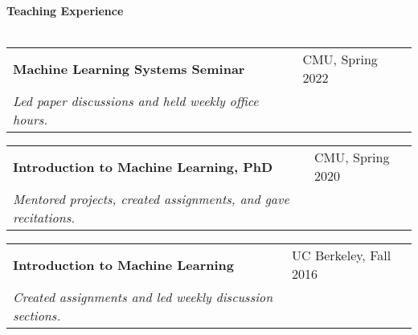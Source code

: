\documentclass{article}
\begin{document}
\vspace{3mm}
\noindent
\textbf{{\Large Teaching Experience}}\\[-2mm]
\vspace{-1.5mm}
\HRule\\
\noindent
\begin{tabular}{@{}p{}p{}@{}}
\vspace{-0mm}\textbf{Machine Learning Systems Seminar} & \vspace{-0mm}CMU, Spring 2022 \\
\indent
\hspace{1.5mm}
\textit{Led paper discussions and held weekly office hours.} \\
\end{tabular}
\vspace{0.5mm}
\begin{tabular}{@{}p{}p{}@{}}
\textbf{Introduction to Machine Learning, PhD} & CMU, Spring 2020 \\
\indent
\hspace{1.5mm}
\textit{Mentored projects, created assignments, and gave recitations. }\\
\end{tabular}
\vspace{0.5mm}
\noindent
\begin{tabular}{@{}p{}p{}@{}}
\textbf{Introduction to Machine Learning} & UC Berkeley, Fall 2016 \\
\indent
\hspace{1.5mm}
\textit{Created assignments and led weekly discussion sections.} \\
\end{tabular}
\end{document}
